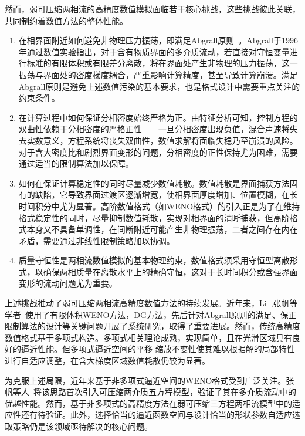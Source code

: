 \documentclass[12pt,a4paper]{article}
\numberwithin{equation}{section}    %
\begin{document}
然而，弱可压缩两相流的高精度数值模拟面临若干核心挑战，这些挑战彼此关联，共同制约着数值方法的整体性能。
\begin{enumerate}
    \item 在相界面附近如何避免非物理压力振荡，即满足Abgrall原则~\cite{ABGRALL1996150}。Abgrall于1996年通过数值实验指出，对于含有物质界面的多介质流动，若直接对守恒变量进行标准的有限体积或有限差分离散，将在界面处产生非物理的压力振荡，这一振荡与界面处的密度梯度耦合，严重影响计算精度，甚至导致计算崩溃。满足Abgrall原则是避免上述数值污染的基本要求，也是格式设计中需要重点关注的约束条件。
    \item 在计算过程中如何保证分相密度始终严格为正。由特征分析可知，控制方程的双曲性依赖于分相密度的严格正性——一旦分相密度出现负值，混合声速将失去实数意义，方程系统将丧失双曲性，数值求解将面临失稳乃至崩溃的风险。对于含大密度比和剧烈界面变形的问题，分相密度的正性保持尤为困难，需要通过适当的限制算法加以保障。
    \item 如何在保证计算稳定性的同时尽量减少数值耗散。数值耗散是界面捕获方法固有的缺陷，它导致界面过渡区逐渐增宽，使相界面厚度增加、位置模糊，在长时间积分中尤为显著。高阶数值格式（如WENO格式）的引入正是为了在维持格式稳定性的同时，尽量抑制数值耗散，实现对相界面的清晰捕获，但高阶格式本身又不具备单调性，在间断附近可能产生非物理振荡，二者之间存在内在矛盾，需要通过非线性限制策略加以协调。
    \item 质量守恒性是两相流数值模拟的基本物理约束，数值格式须采用守恒型离散形式，以确保两相质量在离散水平上的精确守恒，这对于长时间积分或含强界面变形的流动问题尤为重要。
\end{enumerate}
上述挑战推动了弱可压缩两相流高精度数值方法的持续发展。近年来，Li~\cite{li2020finite,li2022simplified},张帆等学者~\cite{zhang2023physical}使用了有限体积WENO方法，DG方法，先后针对Abgrall原则的满足、保正限制算法的设计等关键问题开展了系统研究，取得了重要进展。然而，传统高精度数值格式基于多项式构造。多项式相关理论成熟，实现简单，且在光滑区域具有良好的逼近性能。但多项式逼近空间的平移-缩放不变性使其难以根据解的局部特性进行自适应调整，在含大梯度区域数值耗散仍较为显著。

为克服上述局限，近年来基于非多项式逼近空间的WENO格式受到广泛关注。张帆等人~\cite{Zhang2025exponential}将该思路首次引入可压缩两介质五方程模型，验证了其在多介质流动中的优越性能。然而，基于非多项式的高精度方法在弱可压缩三方程两相流模型中的适应性还有待验证。此外，选择恰当的逼近函数空间与设计恰当的形状参数自适应选取策略仍是该领域亟待解决的核心问题。
\end{document}
